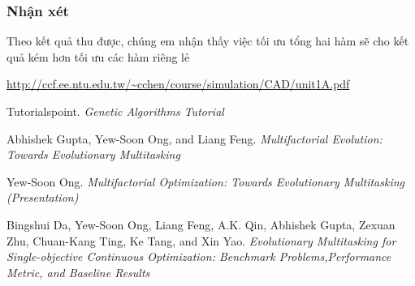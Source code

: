 \documentclass[a4paper,12pt]{report}
\begin{document}
\subsubsection{Nhận xét}
Theo kết quả thu được, chúng em nhận thấy việc tối ưu tổng hai hàm sẽ cho kết quả kém hơn tối ưu các hàm riêng lẻ



\begin{thebibliography}{9}
 \url{http://ccf.ee.ntu.edu.tw/~cchen/course/simulation/CAD/unit1A.pdf}

 Tutorialspoint. \textit{Genetic Algorithms Tutorial}

 Abhishek Gupta, Yew-Soon Ong, and Liang Feng. \textit{Multifactorial Evolution: Towards Evolutionary Multitasking}

 Yew-Soon Ong. \textit{Multifactorial Optimization: Towards Evolutionary Multitasking (Presentation)} 

 Bingshui Da, Yew-Soon Ong, Liang Feng, A.K. Qin, Abhishek Gupta, Zexuan Zhu, Chuan-Kang Ting, Ke Tang, and Xin Yao. \textit{Evolutionary Multitasking for Single-objective Continuous Optimization: Benchmark Problems,Performance Metric, and Baseline Results}

\end{thebibliography}
\end{document}
